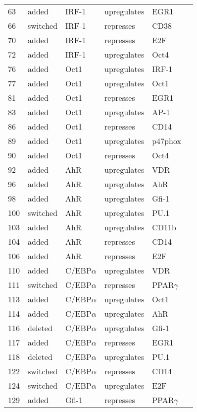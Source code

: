 \begin{center}
\begin{scriptsize}
\begin{supertabular}{|p{2 cm}|p{2cm}|p{3cm}|p{2.5cm}|p{2cm}|p{1.5cm}|}
63 &  added &  IRF-1  & upregulates &  EGR1 & \\
66 &  switched &  IRF-1  & represses &  CD38 & \\
70 &  added &  IRF-1  & represses &  E2F & \\
72 &  added &  IRF-1  & upregulates &  Oct4 & \\
76 &  added &  Oct1  & upregulates &  IRF-1 & \\
77 &  added &  Oct1  & upregulates &  Oct1 & \cite{Pankratova2003}\\
81 &  added &  Oct1  & represses &  EGR1 & \\
83 &  added &  Oct1  & upregulates &  AP-1 & \cite{Ullman1993}\\
86 &  added &  Oct1  & represses &  CD14 & \\
89 &  added &  Oct1  & upregulates &  p47phox & \\ 
90 &  added &  Oct1  & represses &  Oct4 & \\
92 &  added &  AhR  & upregulates &  VDR & \\
96 &  added &  AhR  & upregulates &  AhR & \\
98 &  added &  AhR  & upregulates &  Gfi-1 & \\
100 &  switched &  AhR  & upregulates &  PU.1 & \\
103 &  added &  AhR  & upregulates &  CD11b & \\
104 &  added &  AhR  & represses &  CD14 & \\
106 &  added &  AhR  & represses &  E2F & \cite{Marlowe2004}\\
110 &  added &  C/EBP$\alpha$  & upregulates &  VDR & \\
111 &  switched &  C/EBP$\alpha$  & represses &  PPAR$\gamma$ & \\
113 &  added &  C/EBP$\alpha$  & upregulates &  Oct1 & \\
114 &  added &  C/EBP$\alpha$  & upregulates &  AhR & \\
116 &  deleted &  C/EBP$\alpha$  & upregulates &  Gfi-1 & \\
117 &  added &  C/EBP$\alpha$  & represses &  EGR1 & \cite{Hasemann2014}\\
118 &  deleted &  C/EBP$\alpha$  & upregulates &  PU.1 & \\
122 &  switched &  C/EBP$\alpha$  & represses &  CD14 & \\
124 &  switched &  C/EBP$\alpha$  & upregulates &  E2F & \\
129 &  added &  Gfi-1  & represses &  PPAR$\gamma$  & \\

\end{supertabular}
\end{scriptsize}
\end{center}
